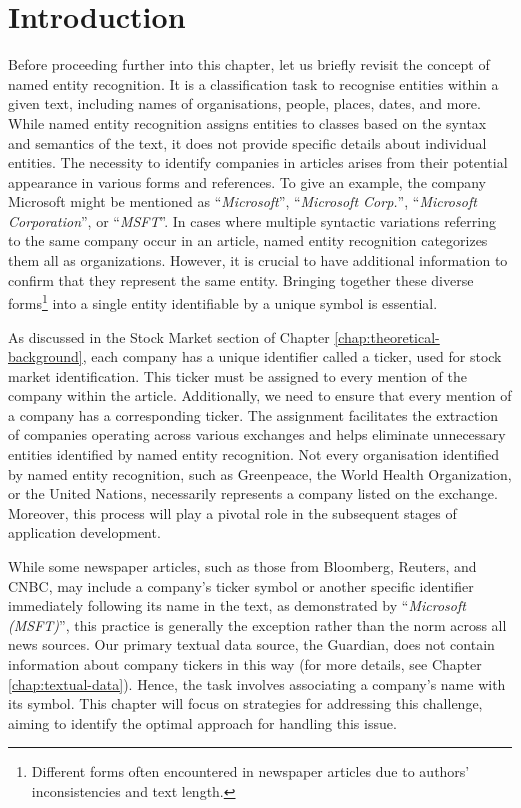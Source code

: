 \section{Introduction}
\label{sec:introduction}
Before proceeding further into this chapter, let us briefly revisit the concept of named entity recognition. It is a classification task to recognise entities within a given text, including names of organisations, people, places, dates, and more. While named entity recognition assigns entities to classes based on the syntax and semantics of the text, it does not provide specific details about individual entities. The necessity to identify companies in articles arises from their potential appearance in various forms and references. To give an example, the company Microsoft might be mentioned as ``\textit{Microsoft}'', ``\textit{Microsoft Corp.}'', ``\textit{Microsoft Corporation}'', or ``\textit{MSFT}''. In cases where multiple syntactic variations referring to the same company occur in an article, named entity recognition categorizes them all as organizations. However, it is crucial to have additional information to confirm that they represent the same entity. Bringing together these diverse forms\footnote{Different forms often encountered in newspaper articles due to authors' inconsistencies and text length.} into a single entity identifiable by a unique symbol is essential.

As discussed in the Stock Market section of Chapter \ref{chap:theoretical-background}, each company has a unique identifier called a ticker, used for stock market identification. This ticker must be assigned to every mention of the company within the article. Additionally, we need to ensure that every mention of a company has a corresponding ticker. The assignment facilitates the extraction of companies operating across various exchanges and helps eliminate unnecessary entities identified by named entity recognition. Not every organisation identified by named entity recognition, such as Greenpeace, the World Health Organization, or the United Nations, necessarily represents a company listed on the exchange. Moreover, this process will play a pivotal role in the subsequent stages of application development.

While some newspaper articles, such as those from Bloomberg, Reuters, and CNBC, may include a company's ticker symbol or another specific identifier immediately following its name in the text, as demonstrated by ``\textit{Microsoft (MSFT)}'', this practice is generally the exception rather than the norm across all news sources. Our primary textual data source, the Guardian, does not contain information about company tickers in this way (for more details, see Chapter \ref{chap:textual-data}). Hence, the task involves associating a company's name with its symbol. This chapter will focus on strategies for addressing this challenge, aiming to identify the optimal approach for handling this issue.

